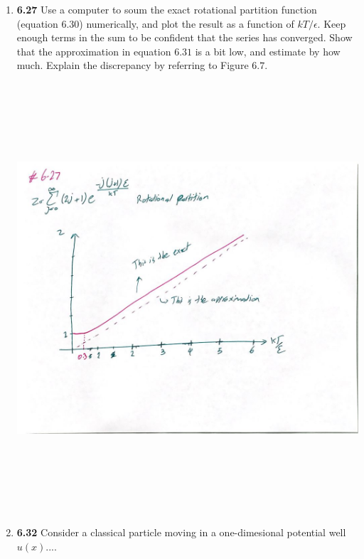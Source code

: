 \documentclass[fleqn]{article}
\begin{document}
  \begin{enumerate}
    \item \textbf{6.27} Use a computer to soum the exact rotational partition function (equation $6.30$) numerically, and 
    plot the result as a function of $kT/ \epsilon$. Keep enough terms in the sum to be confident that the series has converged.
    Show that the approximation in equation $6.31$ is a bit low, and estimate by how much. Explain the discrepancy by 
    referring to Figure $6.7$.

      \begin{center}
        \includegraphics[height=16cm, width=16cm]{627.JPG}
      \end{center}

    \pagebreak

    \item \textbf{6.32} Consider a classical particle moving in a one-dimesional potential well $u(x)$....


\end{enumerate}
\end{document}
